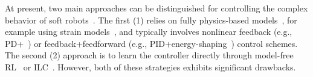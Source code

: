 At present, two main approaches can be distinguished for controlling the complex behavior of soft robots~\citep{thuruthel2018control, della2023model}. The first (1) relies on fully physics-based models~\citep{armanini2023soft}, for example using strain models~\citep{alessi2024rod}, and typically involves nonlinear feedback (e.g., PD+~\citep{della2020model}) or feedback+feedforward (e.g., PID+energy-shaping~\citep{della2023model, caasenbrood2023control, soleti2025model}) control schemes. %
The second (2) approach is to learn the controller directly through model-free \gls{RL}~\citep{morimoto2021model, jitosho2023reinforcement, alessi2024pushing} or \gls{ILC}~\citep{hofer2019iterative, pierallini2023provably}. However, both of these strategies exhibits significant drawbacks.

